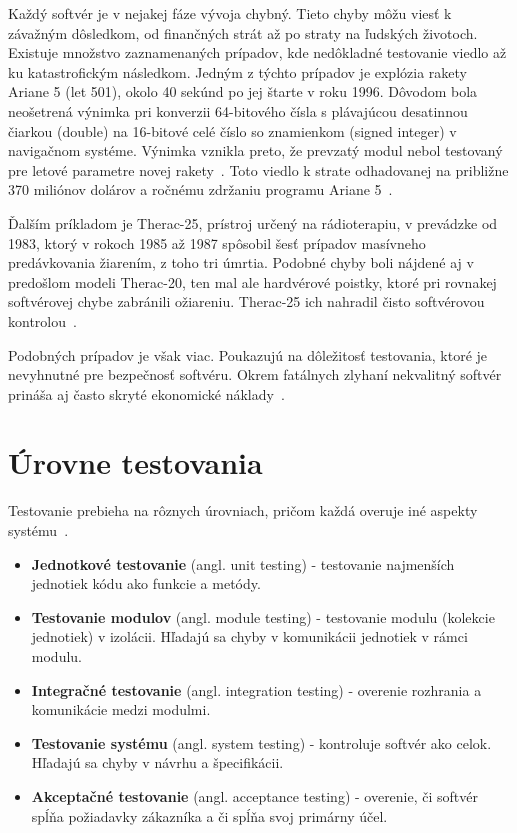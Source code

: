 Každý softvér je v nejakej fáze vývoja chybný. Tieto chyby môžu viesť k závažným dôsledkom, od finančných strát až po straty na ľudských životoch. Existuje množstvo zaznamenaných prípadov, kde nedôkladné testovanie viedlo až ku katastrofickým následkom. Jedným z týchto prípadov je explózia rakety Ariane 5 (let 501), okolo 40 sekúnd po jej štarte v roku 1996. Dôvodom bola neošetrená výnimka pri konverzii 64-bitového čísla s plávajúcou desatinnou čiarkou (double) na 16-bitové celé číslo so znamienkom (signed integer) v navigačnom systéme. Výnimka vznikla preto, že prevzatý modul nebol testovaný pre letové parametre novej rakety~\cite{Lions1996}. Toto viedlo k strate odhadovanej na približne 370 miliónov dolárov a ročnému zdržaniu programu Ariane 5~\cite{LeLann1996}.



Ďalším príkladom je Therac-25, prístroj určený na rádioterapiu, v prevádzke od 1983, ktorý v rokoch 1985 až 1987 spôsobil šesť prípadov masívneho predávkovania žiarením, z toho tri úmrtia. Podobné chyby boli nájdené aj v predošlom modeli Therac-20, ten mal ale hardvérové poistky, ktoré pri rovnakej softvérovej chybe zabránili ožiareniu. Therac-25 ich nahradil čisto softvérovou kontrolou~\cite{Leveson1993}.


Podobných prípadov je však viac. Poukazujú na dôležitosť testovania, ktoré je nevyhnutné pre bezpečnosť softvéru. Okrem fatálnych zlyhaní nekvalitný softvér prináša aj často skryté ekonomické náklady~\cite{Krasner2022}.


\section{Úrovne testovania}
\label{sub:urovne_testovania}
Testovanie prebieha na rôznych úrovniach, pričom každá overuje iné aspekty systému~\cite{Ammann2016}.

\begin{itemize}
    \item \textbf{Jednotkové testovanie} (angl. unit testing) - testovanie najmenších jednotiek kódu ako funkcie a metódy.
    \item \textbf{Testovanie modulov} (angl. module testing) - testovanie modulu (kolekcie jednotiek) v izolácii. Hľadajú sa chyby v komunikácii jednotiek v rámci modulu. 
    \item \textbf{Integračné testovanie} (angl. integration testing) - overenie rozhrania a komunikácie medzi modulmi. 
    \item \textbf{Testovanie systému} (angl. system testing) - kontroluje softvér ako celok. Hľadajú sa chyby v návrhu a špecifikácii.
    \item \textbf{Akceptačné testovanie} (angl. acceptance testing) - overenie, či softvér spĺňa požiadavky zákazníka a či spĺňa svoj primárny účel.
\end{itemize}

